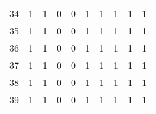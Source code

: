 \begin{longtable}{cp{1.5cm}p{1.5cm}p{1.5cm}p{1.5cm}p{1.5cm}p{1.5cm}p{1.5cm}p{1.5cm}p{1.5cm}}
34 &                          1 &                             1 &                          0 &                        0 &                           1 &                        1 &                         1 &                            1 &                         1 \\
35 &                          1 &                             1 &                          0 &                        0 &                           1 &                        1 &                         1 &                            1 &                         1 \\
36 &                          1 &                             1 &                          0 &                        0 &                           1 &                        1 &                         1 &                            1 &                         1 \\
37 &                          1 &                             1 &                          0 &                        0 &                           1 &                        1 &                         1 &                            1 &                         1 \\
38 &                          1 &                             1 &                          0 &                        0 &                           1 &                        1 &                         1 &                            1 &                         1 \\
39 &                          1 &                             1 &                          0 &                        0 &                           1 &                        1 &                         1 &                            1 &                         1 \\
\end{longtable}
